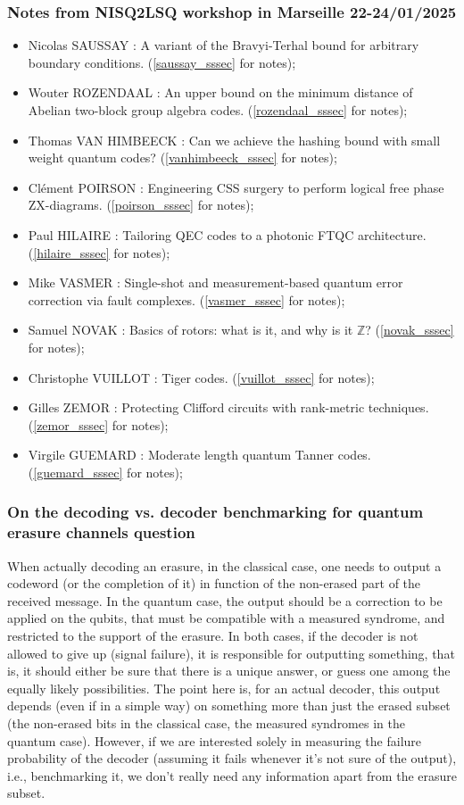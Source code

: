 \documentclass{article}
\begin{document}
\subsubsection{Notes from NISQ2LSQ workshop in Marseille 22-24/01/2025}
\begin{itemize}
    \item Nicolas SAUSSAY : A variant of the Bravyi-Terhal bound for arbitrary boundary conditions. (\ref{saussay_sssec} for notes);
    \item Wouter ROZENDAAL : An upper bound on the minimum distance of Abelian two-block group algebra codes. (\ref{rozendaal_sssec} for notes);
    \item Thomas VAN HIMBEECK : Can we achieve the hashing bound with small weight quantum codes? (\ref{vanhimbeeck_sssec} for notes);
    \item Clément POIRSON : Engineering CSS surgery to perform logical free phase ZX-diagrams. (\ref{poirson_sssec} for notes);
    \item Paul HILAIRE : Tailoring QEC codes to a photonic FTQC architecture. (\ref{hilaire_sssec} for notes);
    \item Mike VASMER : Single-shot and measurement-based quantum error correction via fault complexes. (\ref{vasmer_sssec} for notes);
    \item Samuel NOVAK : Basics of rotors: what is it, and why is it $\mathbb{Z}$? (\ref{novak_sssec} for notes);
    \item Christophe VUILLOT : Tiger codes. (\ref{vuillot_sssec} for notes);
    \item Gilles ZEMOR : Protecting Clifford circuits with rank-metric techniques. (\ref{zemor_sssec} for notes);
    \item Virgile GUEMARD : Moderate length quantum Tanner codes. (\ref{guemard_sssec} for notes);
\end{itemize}

\subsubsection{On the decoding vs. decoder benchmarking for quantum erasure channels question}

When actually decoding an erasure, in the classical case, one needs to output a codeword (or the completion of it) in function of the non-erased part of the received message. In the quantum case, the output should be a correction to be applied on the qubits, that must be compatible with a measured syndrome, and restricted to the support of the erasure. In both cases, if the decoder is not allowed to give up (signal failure), it is responsible for outputting something, that is, it should either be sure that there is a unique answer, or guess one among the equally likely possibilities. The point here is, for an actual decoder, this output depends (even if in a simple way) on something more than just the erased subset (the non-erased bits in the classical case, the measured syndromes in the quantum case). However, if we are interested solely in measuring the failure probability of the decoder (assuming it fails whenever it's not sure of the output), i.e., benchmarking it, we don't really need any information apart from the erasure subset. 
\end{document}
